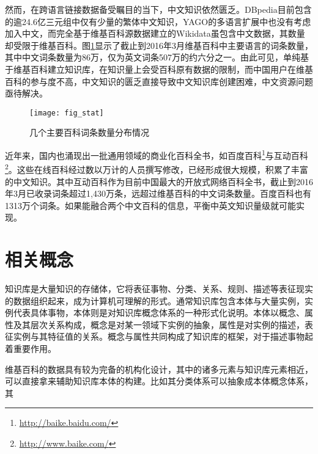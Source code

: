 然而，在跨语言链接数据备受瞩目的当下，中文知识依然匮乏。DBpedia目前包含的逾24.6亿三元组中仅有少量的繁体中文知识，YAGO的多语言扩展中也没有考虑加入中文，而完全基于维基百科源数据建立的Wikidata虽包含中文数据，其数量却受限于维基百科。图\ref{fig:wiki-stat}显示了截止到2016年3月维基百科中主要语言的词条数量，其中中文词条数量为86万，仅为英文词条507万的约六分之一。由此可见，单纯基于维基百科建立知识库，在知识量上会受百科原有数据的限制，而中国用户在维基百科的参与度不高，中文知识的匮乏直接导致中文知识库创建困难，中文资源问题亟待解决。

\begin{figure}[h]
  \centering
  \texttt{[image: fig\_stat]}
  \caption{几个主要百科词条数量分布情况}
  \label{fig:wiki-stat}
\end{figure}

近年来，国内也涌现出一批通用领域的商业化百科全书，如百度百科\footnote{\url{http://baike.baidu.com/}}与互动百科\footnote{\url{http://www.baike.com/}}。这些在线百科经过数以万计的人员撰写修改，已经形成很大规模，积累了丰富的中文知识。其中互动百科作为目前中国最大的开放式网络百科全书，截止到2016年3月已收录词条超过1,430万条，远超过维基百科的中文词条数量。百度百科也有1313万个词条。如果能融合两个中文百科的信息，平衡中英文知识量级就可能实现。


\section{相关概念}
知识库是大量知识的存储体，它将表征事物、分类、关系、规则、描述等表征现实的数据组织起来，成为计算机可理解的形式。通常知识库包含本体与大量实例，实例代表具体事物，本体则是对知识库概念体系的一种形式化说明。本体以概念、属性及其层次关系构成，概念是对某一领域下实例的抽象，属性是对实例的描述，表征实例与其特征值的关系。概念与属性共同构成了知识库的框架，对于描述事物起着重要作用。

维基百科的数据具有较为完备的机构化设计，其中的诸多元素与知识库元素相近，可以直接拿来辅助知识库本体的构建。比如其分类体系可以抽象成本体概念体系，其


